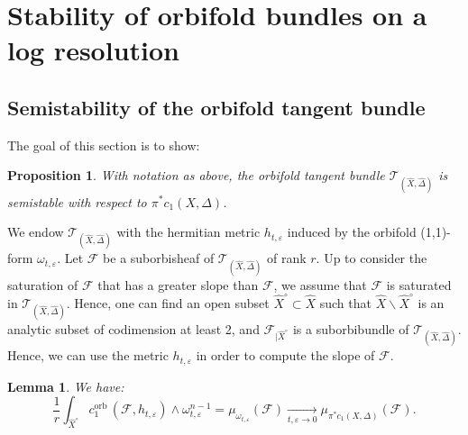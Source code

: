 \documentclass[12pt,a4paper]{amsart}
\newcommand{\orb}{\mathrm{orb}\,}
\theoremstyle{plain}
\newtheorem{lemm}[theo]{Lemma}
\newtheorem{prop}[theo]{Proposition}
\theoremstyle{definition}
\begin{document}
\section{Stability of orbifold bundles on a log resolution}


\subsection{Semistability of the orbifold tangent bundle}

The goal of this section is to show:

\begin{prop}
    With notation as above, the orbifold tangent bundle $\mathcal{T}_{(\widehat{X}, \widehat{\Delta})}$ is semistable with respect to $\pi^*c_1(X, \Delta)$.
\end{prop}

We endow $\mathcal{T}_{(\widehat{X}, \widehat{\Delta})}$ with the hermitian metric $h_{t, \varepsilon}$ induced by the orbifold (1,1)-form $\omega_{t, \varepsilon}$. Let $\mathcal{F}$ be a suborbisheaf of $\mathcal{T}_{(\widehat{X}, \widehat{\Delta})}$ of rank $r$. Up to consider the saturation of $\mathcal{F}$ that has a greater slope than $\mathcal{F}$, we assume that $\mathcal{F}$ is saturated in $\mathcal{T}_{(\widehat{X}, \widehat{\Delta})}$. Hence, one can find an open subset $\widehat{X}^\circ \subset \widehat{X}$ such that $\widehat{X} \backslash \widehat{X}^\circ$ is an analytic subset of codimension at least 2, and $\mathcal{F}_{|\widehat{X}^\circ}$ is a suborbibundle of $\mathcal{T}_{(\widehat{X}, \widehat{\Delta})}$. Hence, we can use the metric $h_{t, \varepsilon}$ in order to compute the slope of $\mathcal{F}$.

\begin{lemm}\label{Kobayashi orbifolde slope}
    We have:
    $$
    \frac{1}{r}\int_{\widehat{X}^\circ} c_1^\orb(\mathcal{F}, h_{t, \varepsilon}) \wedge \omega_{t, \varepsilon}^{n-1} = \mu_{\omega_{t, \varepsilon}}(\mathcal{F}) \underset{t, \varepsilon \longrightarrow 0}{\longrightarrow} \mu_{\pi^* c_1(X, \Delta)}(\mathcal{F}).
    $$
\end{lemm}
\end{document}
